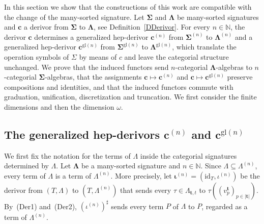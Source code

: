\documentclass[a4paper, reqno
]{amsart}
\newcommand{\bb}[1]{\ensuremath{\lvert #1 \rvert}}
\newcommand{\sig}[1]{\mathbf{#1}}             %
\newcommand{\id}{\mathrm{id}}
\newcommand{\gl}{\mathrm{gl}}                %
\theoremstyle{plain}
\theoremstyle{definition}
\begin{document}
In this section we show that the constructions of this work are compatible with the change of the many-sorted signature.
Let $\sig{\Sigma}$ and $\sig{\Lambda}$ be many-sorted signatures and $\mathbf{c}$ a derivor from $\sig{\Sigma}$ to $\sig{\Lambda}$, see Definition~\ref{DDerivor}.
For every $n\in\mathbb{N}$, the derivor $\mathbf{c}$ determines a generalized hep-derivor $\mathbf{c}^{(n)}$ from $\sig{\Sigma}^{(n)}$ to $\sig{\Lambda}^{(n)}$ and a generalized hep-derivor $\mathbf{c}^{\gl(n)}$ from $\sig{\Sigma}^{\gl(n)}$ to $\sig{\Lambda}^{\gl(n)}$, which translate the operation symbols of $\Sigma$ by means of $c$ and leave the categorial structure unchanged.
We prove that the induced functors send $n$-categorial $\sig{\Lambda}$-algebras to $n$-categorial $\sig{\Sigma}$-algebras, that the assignments $\mathbf{c}\mapsto\mathbf{c}^{(n)}$ and $\mathbf{c}\mapsto\mathbf{c}^{\gl(n)}$ preserve compositions and identities, and that the induced functors commute with graduation, unification, discretization and truncation.
We first consider the finite dimensions and then the dimension $\omega$.

\subsection{The generalized hep-derivors \texorpdfstring{$\mathbf{c}^{(n)}$ and $\mathbf{c}^{\gl(n)}$}{c(n) and cgl(n)}}\label{SChangeSigDerivors}

We first fix the notation for the terms of $\Lambda$ inside the categorial signatures determined by $\Lambda$.
Let $\sig{\Lambda}$ be a many-sorted signature and $n\in\mathbb{N}$.
Since $\Lambda\subseteq\Lambda^{(n)}$, every term of $\Lambda$ is a term of $\Lambda^{(n)}$.
More precisely, let $\boldsymbol{\iota}^{(n)}=(\id_{T},\iota^{(n)})$ be the derivor from $(T,\Lambda)$ to $(T,\Lambda^{(n)})$ that sends every $\tau\in\Lambda_{\mathbf{t},t}$ to $\tau((v^{\mathbf{t}}_{p})_{p\in\bb{\mathbf{t}}})$.
By~(Der1) and~(Der2), $(\iota^{(n)})^{\sharp}$ sends every term $P$ of $\Lambda$ to $P$, regarded as a term of $\Lambda^{(n)}$.
\end{document}
